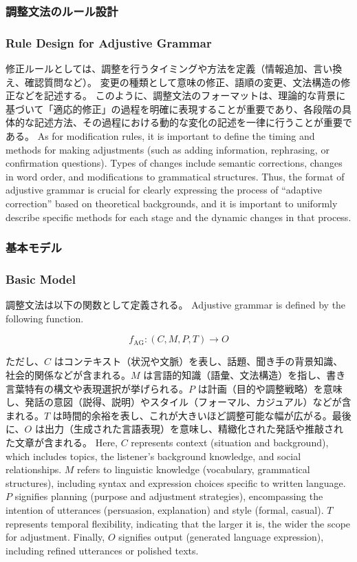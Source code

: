\documentclass[a4paper,xelatex,ja=standard]{bxjsarticle}
\begin{document}
\ifJPN
\subsubsection{調整文法のルール設計}
\else
  \subsubsection{Rule Design for Adjustive Grammar}
\fi

\ifJPN
修正ルールとしては、調整を行うタイミングや方法を定義（情報追加、言い換え、確認質問など）。
変更の種類として意味の修正、語順の変更、文法構造の修正などを記述する。
このように、調整文法のフォーマットは、理論的な背景に基づいて「適応的修正」の過程を明確に表現することが重要であり、各段階の具体的な記述方法、その過程における動的な変化の記述を一律に行うことが重要である。
\else
As for modification rules, it is important to define the timing and methods for making adjustments (such as adding information, rephrasing, or confirmation questions).
Types of changes include semantic corrections, changes in word order, and modifications to grammatical structures.
Thus, the format of adjustive grammar is crucial for clearly expressing the process of ``adaptive correction'' based on theoretical backgrounds, and it is important to uniformly describe specific methods for each stage and the dynamic changes in that process.
\fi

\ifJPN
\subsubsection{基本モデル}
\else
  \subsubsection{Basic Model}
\fi

\ifJPN
調整文法は以下の関数として定義される。
\else
Adjustive grammar is defined by the following function.
\fi

\[
f_{\text{AG}} : (C, M, P, T) \to O
\]

\ifJPN
ただし、\( C \) はコンテキスト（状況や文脈）を表し、話題、聞き手の背景知識、社会的関係などが含まれる。\( M \) は言語的知識（語彙、文法構造）を指し、書き言葉特有の構文や表現選択が挙げられる。\( P \) は計画（目的や調整戦略）を意味し、発話の意図（説得、説明）やスタイル（フォーマル、カジュアル）などが含まれる。\( T \) は時間的余裕を表し、これが大きいほど調整可能な幅が広がる。最後に、\( O \) は出力（生成された言語表現）を意味し、精緻化された発話や推敲された文章が含まれる。
\else
Here, \( C \) represents context (situation and background), which includes topics, the listener's background knowledge, and social relationships. \( M \) refers to linguistic knowledge (vocabulary, grammatical structures), including syntax and expression choices specific to written language. \( P \) signifies planning (purpose and adjustment strategies), encompassing the intention of utterances (persuasion, explanation) and style (formal, casual). \( T \) represents temporal flexibility, indicating that the larger it is, the wider the scope for adjustment. Finally, \( O \) signifies output (generated language expression), including refined utterances or polished texts.
\fi
\end{document}
